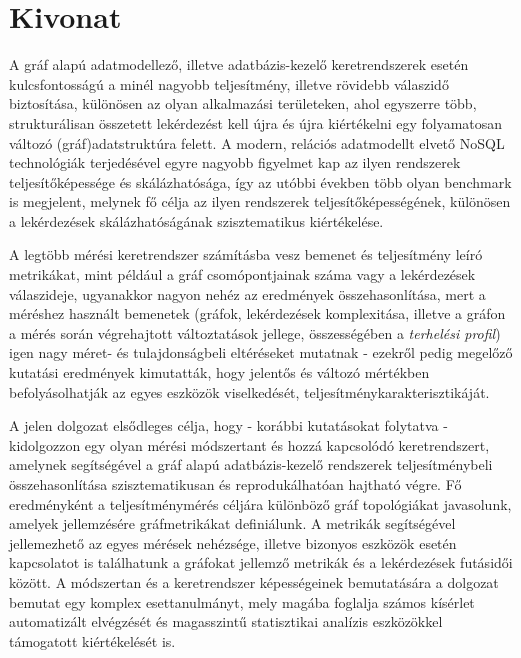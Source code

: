 \setcounter{page}{1}


\englishParagraph
\chapter*{Kivonat}

A gráf alapú adatmodellező, illetve adatbázis-kezelő keretrendszerek esetén kulcsfontosságú a minél nagyobb teljesítmény, illetve rövidebb válaszidő biztosítása, különösen az olyan alkalmazási területeken, ahol egyszerre több, strukturálisan összetett lekérdezést kell újra és újra kiértékelni egy folyamatosan változó (gráf)adatstruktúra felett. A modern, relációs adatmodellt elvető NoSQL technológiák terjedésével egyre nagyobb figyelmet kap az ilyen rendszerek teljesítőképessége és skálázhatósága, így az utóbbi években több olyan benchmark is megjelent, melynek fő célja az ilyen rendszerek teljesítőképességének, különösen a lekérdezések skálázhatóságának szisztematikus kiértékelése. 

A legtöbb mérési keretrendszer számításba vesz bemenet és teljesítmény leíró metrikákat, mint például a gráf csomópontjainak száma vagy a lekérdezések válaszideje, ugyanakkor nagyon nehéz az eredmények összehasonlítása, mert a méréshez használt bemenetek (gráfok, lekérdezések komplexitása, illetve a gráfon a mérés során végrehajtott változtatások jellege, összességében a \emph{terhelési profil}) igen nagy méret- és tulajdonságbeli eltéréseket mutatnak - ezekről pedig megelőző kutatási eredmények kimutatták, hogy jelentős és változó mértékben befolyásolhatják az egyes eszközök viselkedését, teljesítménykarakterisztikáját.

A jelen dolgozat elsődleges célja, hogy - korábbi kutatásokat folytatva - kidolgozzon egy olyan mérési módszertant és hozzá kapcsolódó keretrendszert, amelynek segítségével a gráf alapú adatbázis-kezelő rendszerek teljesítménybeli összehasonlítása szisztematikusan és reprodukálhatóan hajtható végre. Fő eredményként a teljesítménymérés céljára különböző gráf topológiákat javasolunk, amelyek jellemzésére gráfmetrikákat definiálunk. A metrikák segítségével jellemezhető az egyes mérések nehézsége, illetve bizonyos eszközök esetén kapcsolatot is találhatunk a gráfokat jellemző metrikák és a lekérdezések futásidői között. A módszertan és a keretrendszer képességeinek bemutatására a dolgozat bemutat egy komplex esettanulmányt, mely magába foglalja számos kísérlet automatizált elvégzését és magasszintű statisztikai analízis eszközökkel támogatott kiértékelését is.

